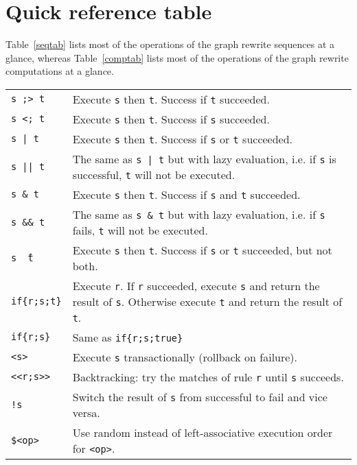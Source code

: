 \section{Quick reference table}

Table~\ref{seqtab} lists most of the operations of the graph rewrite sequences at a glance,
whereas Table~\ref{comptab} lists most of the operations of the graph rewrite computations at a glance.

\begin{table}[htbp]
\begin{minipage}{\linewidth} \renewcommand{\footnoterule}{} 
\begin{tabularx}{\linewidth}{|lX|}
\hline
\texttt{s ;> t}		& Execute \texttt{s} then \texttt{t}. Success if \texttt{t} succeeded.\\
\texttt{s <; t}		& Execute \texttt{s} then \texttt{t}. Success if \texttt{s} succeeded.\\
\texttt{s | t}		& Execute \texttt{s} then \texttt{t}. Success if \texttt{s} or \texttt{t} succeeded.\\
\texttt{s || t}	& The same as \texttt{s | t} but with lazy evaluation, i.e. if \texttt{s} is successful, \texttt{t} will not be executed.\\
\texttt{s \& t}	& Execute \texttt{s} then \texttt{t}. Success if \texttt{s} and \texttt{t} succeeded.\\
\texttt{s \&\& t}	& The same as \texttt{s \& t} but with lazy evaluation, i.e. if \texttt{s} fails, \texttt{t} will not be executed.\\
\texttt{s \^\ t}	& Execute \texttt{s} then \texttt{t}. Success if \texttt{s} or \texttt{t} succeeded, but not both.\\
\texttt{if\{r;s;t\}}	& Execute \texttt{r}. If \texttt{r} succeeded, execute \texttt{s} and return the result of \texttt{s}. Otherwise execute \texttt{t} and return the result of \texttt{t}.\\
\texttt{if\{r;s\}}	& Same as \texttt{if\{r;s;true\}}\\
\texttt{<s>}	& Execute \texttt{s} transactionally (rollback on failure).\\
\texttt{<<r;s>>}	& Backtracking: try the matches of rule \texttt{r} until \texttt{s} succeeds.\\
\texttt{!s}		& Switch the result of \texttt{s} from successful to fail and vice versa.\\
\texttt{\$<op>}	& Use random instead of left-associative execution order for \texttt{<op>}. \\

\end{tabularx}
\end{minipage}
\end{table}
